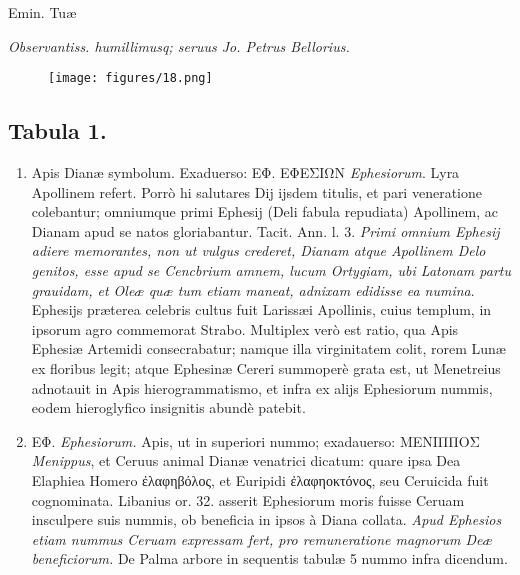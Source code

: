 \documentclass[a4paper, 11pt, oneside, polutonikogreek, latin]{article}
\begin{document}
Emin. Tuæ

\emph{Observantiss. humillimusq; seruus Jo. Petrus Bellorius.}
\clearpage
\vspace*{\fill}
\begin{figure}[H]
\centering
\texttt{[image: figures/18.png]}
\end{figure}
\vspace*{\fill}
\clearpage
\subsection*{Tabula 1.}
\begin{enumerate}
    \item Apis Dianæ symbolum. Exaduerso: \foreignlanguage{greek}{ΕΦ. ΕΦΕΣΙΩΝ} \emph{Ephesiorum}. Lyra Apollinem refert. Porrò hi salutares Dij ijsdem titulis, et pari veneratione colebantur; omniumque primi Ephesij (Deli fabula repudiata) Apollinem, ac Dianam apud se natos gloriabantur. Tacit. Ann. l. 3. \emph{Primi omnium Ephesij adiere memorantes, non ut vulgus crederet, Dianam atque Apollinem Delo genitos, esse apud se Cencbrium amnem, lucum Ortygiam, ubi Latonam partu grauidam, et Oleæ quæ tum etiam maneat, adnixam edidisse ea numina}. Ephesijs præterea celebris cultus fuit Larissæi Apollinis, cuius templum, in ipsorum agro commemorat Strabo. Multiplex verò est ratio, qua Apis Ephesiæ Artemidi consecrabatur; namque illa virginitatem colit, rorem Lunæ ex floribus legit; atque Ephesinæ Cereri summoperè grata est, ut Menetreius adnotauit in Apis hierogrammatismo, et infra ex alijs Ephesiorum nummis, eodem hieroglyfico insignitis abundè patebit.

    \item \foreignlanguage{greek}{ΕΦ.} \emph{Ephesiorum.} Apis, ut in superiori nummo; exadauerso: \foreignlanguage{greek}{ΜΕΝΙΠΠΟΣ} \emph{Menippus}, et Ceruus animal Dianæ venatrici dicatum: quare ipsa Dea Elaphiea Homero ἐλαφηβόλος, et Euripidi ἐλαφηοκτόνος, seu Ceruicida fuit cognominata. Libanius or. 32. asserit Ephesiorum moris fuisse Ceruam insculpere suis nummis, ob beneficia in ipsos à Diana collata. \emph{Apud Ephesios etiam nummus Ceruam expressam fert, pro remuneratione magnorum Deæ beneficiorum.} De Palma arbore in sequentis tabulæ 5 nummo infra dicendum.


\end{enumerate}
\end{document}
